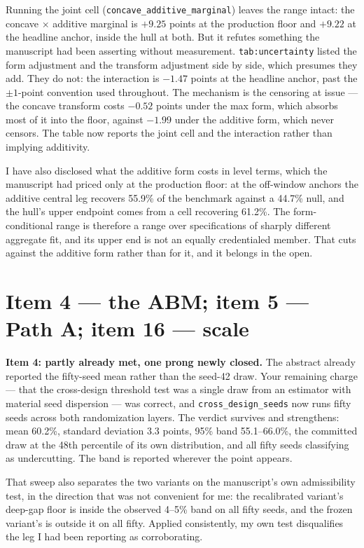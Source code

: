 \documentclass[11pt]{article}
\newcommand{\mlabel}[1]{\texttt{#1}}
\newcommand{\run}[1]{\texttt{#1}}
\begin{document}
Running the joint cell (\run{concave\_additive\_marginal}) leaves the range intact:
the concave $\times$ additive marginal is $+9.25$ points at the production floor and
$+9.22$ at the headline anchor, inside the hull at both. But it refutes something
the manuscript had been asserting without measurement. \mlabel{tab:uncertainty}
listed the form adjustment and the transform adjustment side by side, which
presumes they add. They do not: the interaction is $-1.47$ points at the headline
anchor, past the $\pm 1$-point convention used throughout. The mechanism is the
censoring at issue --- the concave transform costs $-0.52$ points under the max
form, which absorbs most of it into the floor, against $-1.99$ under the additive
form, which never censors. The table now reports the joint cell and the
interaction rather than implying additivity.

I have also disclosed what the additive form costs in level terms, which the
manuscript had priced only at the production floor: at the off-window anchors the
additive central leg recovers 55.9\% of the benchmark against a 44.7\% null, and
the hull's upper endpoint comes from a cell recovering 61.2\%. The
form-conditional range is therefore a range over specifications of sharply
different aggregate fit, and its upper end is not an equally credentialed member.
That cuts against the additive form rather than for it, and it belongs in the
open.

\section{Item 4 --- the ABM; item 5 --- Path A; item 16 --- scale}

\textbf{Item 4: partly already met, one prong newly closed.} The abstract already
reported the fifty-seed mean rather than the seed-42 draw. Your remaining charge
--- that the cross-design threshold test was a single draw from an estimator with
material seed dispersion --- was correct, and \run{cross\_design\_seeds} now runs
fifty seeds across both randomization layers. The verdict survives and
strengthens: mean 60.2\%, standard deviation 3.3 points, 95\% band 55.1--66.0\%,
the committed draw at the 48th percentile of its own distribution, and all fifty
seeds classifying as undercutting. The band is reported wherever the point
appears.

That sweep also separates the two variants on the manuscript's own admissibility
test, in the direction that was not convenient for me: the recalibrated variant's
deep-gap floor is inside the observed 4--5\% band on all fifty seeds, and the
frozen variant's is outside it on all fifty. Applied consistently, my own test
disqualifies the leg I had been reporting as corroborating.
\end{document}
